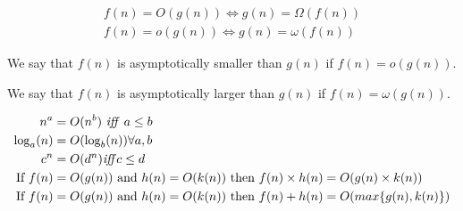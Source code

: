 \begin{definition}
    \begin{align*}
        f(n) = O(g(n)) \iff g(n) = \Omega(f(n)) \\
        f(n) = o(g(n)) \iff g(n) = \omega(f(n))
    \end{align*}
\end{definition}

\begin{definition}
    We say that $f(n)$ is asymptotically smaller than $g(n)$ if $f(n) = o(g(n))$.
\end{definition}

\begin{definition}
    We say that $f(n)$ is asymptotically larger than $g(n)$ if $f(n) = \omega(g(n))$.
\end{definition}

\begin{theorem}
    \begin{align*}
        n^a             & = O(n^b) \text{ \textit{iff} } a \leq b                                                    \\
        \log_a(n)       & = O(\log_b(n)) \forall a, b                                                                \\
        c^n             & = O(d^n) \text{\textit{iff}} c \leq d                                                      \\
        \text{If } f(n) & = O(g(n)) \text{ and } h(n) = O(k(n)) \text{ then } f(n) \times h(n) = O(g(n) \times k(n)) \\
        \text{If } f(n) & = O(g(n)) \text{ and } h(n) = O(k(n)) \text{ then } f(n) + h(n) = O(max\{g(n),k(n)\})      \\
    \end{align*}

\end{theorem}